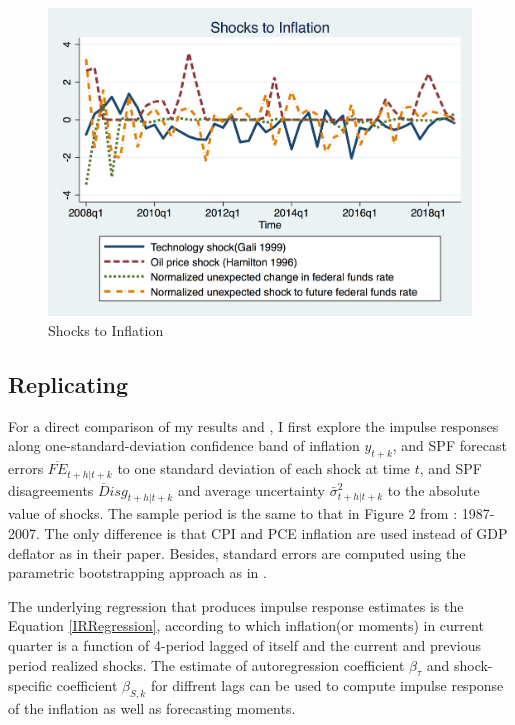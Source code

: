 \documentclass[]{article}
\begin{document}
\begin{figure}[ht]
	\centering
	\includegraphics[width=12cm]{figures/inf_shocksQ.png}
	\caption{ Shocks to Inflation}
	\label{Inflationshocks}
\end{figure}

\subsection{Replicating \citet{coibion2012can}}

For a direct comparison of my results and \citet{coibion2012can}, I first explore the impulse responses along one-standard-deviation confidence band of inflation $y_{t+k}$, and SPF forecast errors $\overline {FE}_{t+h|t+k}$ to one standard deviation of each shock at time $t$, and SPF disagreements $\overline Disg_{t+h|t+k}$ and average uncertainty $\bar\sigma^2_{t+h|t+k}$ to the absolute value of shocks. The sample period is the same to that in Figure 2 from \citet{coibion2012can}: 1987-2007. The only difference is that CPI and PCE inflation are used instead of GDP deflator as in their paper. Besides, standard errors are computed using the parametric bootstrapping approach as in \citet{coibion2012can}. 

The underlying regression that produces impulse response estimates is the Equation \ref{IRRegression}, according to which inflation(or moments) in current quarter is a function of 4-period lagged of itself  and the current and previous period realized shocks. The estimate of autoregression coefficient $\beta_\tau$ and shock-specific coefficient $\beta_{S,k}$ for diffrent lags can be used to compute impulse response of the inflation as well as forecasting moments. 
\end{document}
